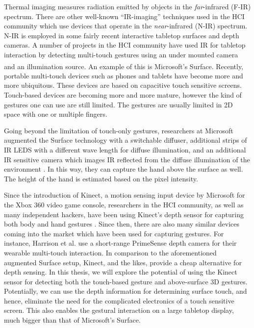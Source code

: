 Thermal imaging measures radiation emitted by objects in the
\textit{far}-infrared (F-IR) spectrum. There are other well-known ``IR-imaging''
techniques used in the HCI community which use devices that operate in the \textit{near}-infrared (N-IR) spectrum.
N-IR is employed in some fairly recent interactive tabletop surfaces and depth
cameras. A number of projects in the HCI community have used IR for tabletop
interaction by detecting multi-touch gestures using an under mounted
camera and an illumination source. An example of this is Microsoft's 
Surface\textsuperscript{\textregistered}. Recently, portable multi-touch devices
such as phones and tablets have become more and more ubiquitous. These devices
are based on capacitive touch sensitive screens. Touch-based devices are
becoming more and more mature, however the kind of gestures one can use are still
limited. The gestures are usually limited in 2D space with one or multiple
fingers. 

Going beyond the limitation of touch-only gestures, researchers at Microsoft
augmented the Surface technology with a switchable diffuser, additional
strips of IR LEDS with a different wave length for diffuse illumination, and an
additional IR sensitive camera which images IR reflected from the diffuse
illumination of the environment \cite{hilliges09}. In this way, they can capture
the hand above the surface as well. The height of the hand is estimated based on
the pixel intensity.

Since the introduction of Kinect, a motion sensing input device by Microsoft for
the Xbox 360 video game console, researchers in the HCI community, as well as
many independent hackers, have been using Kinect's depth sensor for capturing
both body and hand gestures \cite{openni}. Since then, there are also many
similar devices coming into the market which have been used for capturing
gestures. For instance, Harrison et al. \cite{harrison11} use  a short-range
PrimeSense \cite{primesense} depth camera for their wearable multi-touch
interaction. In comparison to the aforementioned augmented Surface setup,
Kinect, and the likes, provide a cheap alternative for depth sensing. In this
thesis, we will explore the potential of using the Kinect sensor for detecting 
both the touch-based gesture and above-surface 3D gestures. Potentially, we can 
use the depth information for determining surface touch, and hence, eliminate
the need for the complicated electronics of a touch sensitive screen. This also 
enables the gestural interaction on a large tabletop display, much bigger than 
that of Microsoft's Surface.

